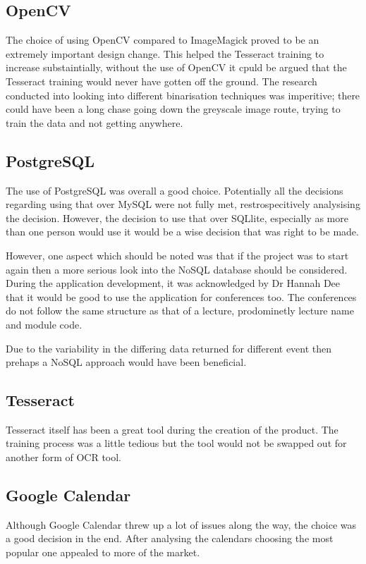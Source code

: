 \subsection{OpenCV}
The choice of using OpenCV compared to ImageMagick proved to be an extremely important design change. This helped the Tesseract training to increase substaintially, without the use of OpenCV it cpuld be argued that the Tesseract training would never have gotten off the ground. The research conducted into looking into different binarisation techniques was imperitive; there could have been a long chase going down the greyscale image route, trying to train the data and not getting anywhere.

\subsection{PostgreSQL}
The use of PostgreSQL was overall a good choice. Potentially all the decisions regarding using that over MySQL were not fully met, restrospecitively analysising the decision.  However, the decision to use that over SQLlite, especially as more than one person would use it would be a wise decision that was right to be made.

However, one aspect which should be noted was that if the project was to start again then a more serious look into the NoSQL database should be considered. During the application development, it was acknowledged by Dr Hannah Dee that it would be good to use the application for conferences too. The conferences do not follow the same structure as that of a lecture, prodominetly lecture name and module code.

Due to the variability in the differing data returned for different event then prehaps a NoSQL approach would have been beneficial.

\subsection{Tesseract}
Tesseract itself has been a great tool during the creation of the product. The training process was a little tedious but the tool would not be swapped out for another form of OCR tool.

\subsection{Google Calendar}
Although Google Calendar threw up a lot of issues along the way, the choice was a good decision in the end. After analysing the calendars choosing the most popular one appealed to more of the market.


